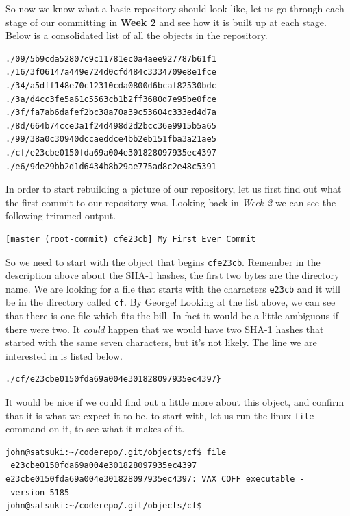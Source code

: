 So now we know what a basic repository should look like, let us go through each stage of our committing in \textbf{Week 2} and see how it is built up at each stage.
Below is a consolidated list of all the objects in the repository.

\begin{Verbatim}
./09/5b9cda52807c9c11781ec0a4aee927787b61f1
./16/3f06147a449e724d0cfd484c3334709e8e1fce
./34/a5dff148e70c12310cda0800d6bcaf82530bdc
./3a/d4cc3fe5a61c5563cb1b2ff3680d7e95be0fce
./3f/fa7ab6dafef2bc38a70a39c53604c333ed4d7a
./8d/664b74cce3a1f24d498d2d2bcc36e9915b5a65
./99/38a0c30940dccaeddce4bb2eb151fba3a21ae5
./cf/e23cbe0150fda69a004e301828097935ec4397
./e6/9de29bb2d1d6434b8b29ae775ad8c2e48c5391
\end{Verbatim}

In order to start rebuilding a picture of our repository, let us first find out what the first commit to our repository was.
Looking back in \emph{Week 2} we can see the following trimmed output.

\begin{Verbatim}
[master (root-commit) cfe23cb] My First Ever Commit
\end{Verbatim}

So we need to start with the object that begins \texttt{cfe23cb}.
Remember in the description above about the SHA-1 hashes, the first two bytes are the directory name.
We are looking for a file that starts with the characters \texttt{e23cb} and it will be in the directory called \texttt{cf}.
By George!  Looking at the list above, we can see that there is one file which fits the bill.
In fact it would be a little ambiguous if there were two.
It \emph{could} happen that we would have two SHA-1 hashes  that started with the same seven characters, but it's not likely.
The line we are interested in is listed below.

\begin{Verbatim}
./cf/e23cbe0150fda69a004e301828097935ec4397}
\end{Verbatim}

It would be nice if we could find out a little more about this object, and confirm that it is what we expect it to be.
to start with, let us run the linux \texttt{file} command on it, to see what it makes of it.

\begin{Verbatim}
john@satsuki:~/coderepo/.git/objects/cf$ file
 e23cbe0150fda69a004e301828097935ec4397
e23cbe0150fda69a004e301828097935ec4397: VAX COFF executable -
 version 5185
john@satsuki:~/coderepo/.git/objects/cf$
\end{Verbatim}


